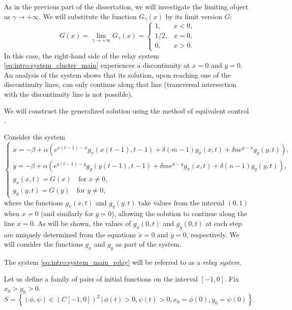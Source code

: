 As in the previous part of the dissertation, we will investigate the limiting object as $\gamma \to +\infty$. We will substitute the function $G_{\gamma} (x)$ by its limit version $G$:
\begin{equation}
	\label{eq:intro:relay_G_tilde}
	G(x) = \lim\limits_{\gamma \to +\infty} G_{\gamma}(x) = 
	\begin{cases}
		1, & x < 0,\\
		1/2, & x = 0,\\
		0, & x > 0.
	\end{cases}
\end{equation}
%
In this case, the right-hand side of the relay system \eqref{eq:intro:system_cluster_main} experiences a discontinuity at $x = 0$ and $y = 0$. An analysis of the system shows that its solution, upon reaching one of the discontinuity lines, can only continue along that line (transversal intersection with the discontinuity line is not possible).

We will construct the generalized solution using the method of equivalent control \cite[\S 4, p. 54]{Filippov1988}.

Consider the system
%
\small
\begin{equation}
	\label{eq:intro:system_main_relay}
	\begin{cases}
		\dot{x} = -\beta + \alpha \left(e^{x(t - 1) - x} g_x(x(t - 1), t - 1) + \delta (m - 1) g_x(x, t) + \delta n e^{y - x} g_y(y, t)\right),\\
		\dot{y} = -\beta + \alpha \left(e^{y(t - 1) - y} g_y(y(t - 1), t - 1) + \delta m e^{x - y} g_x(x, t) + \delta (n - 1) g_y(y, t)\right),\\
		g_x(x, t) = G(x) \quad\text{for } x \neq 0,\\
		g_y(y, t) = G(y) \quad\text{for } y \neq 0,
	\end{cases}
\end{equation}
\normalsize
%
where the functions $g_x(x, t)$ and $g_y(y, t)$ take values from the interval $(0, 1)$ when $x = 0$ (and similarly for $y = 0$), allowing the solution to continue along the line $x = 0$. As will be shown, the values of $g_x(0, t)$ and $g_y(0, t)$ at each step are uniquely determined from the equations $\dot{x} = 0$ and $\dot{y} = 0$, respectively. We will consider the functions $g_x$ and $g_y$ as part of the system.

The system \eqref{eq:intro:system_main_relay} will be referred to as a \emph{relay system}.

Let us define a family of pairs of initial functions on the interval $[-1, 0]$. Fix $x_0 > y_0 > 0$.
\begin{equation}
	\label{eq:intro:initial_set}
	S = \left\{(\phi, \psi) \in (C[-1, 0])^2 \,|\, \phi(t) > 0, \psi(t) > 0, x_0 = \phi(0), y_0 = \psi(0)\right\}.
\end{equation}

